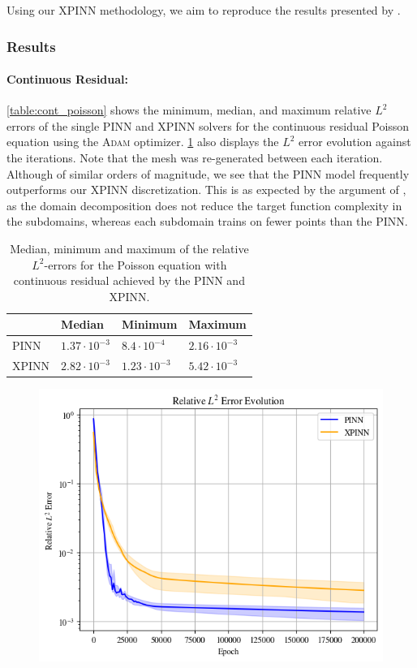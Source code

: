 Using our XPINN methodology, we aim to reproduce the results presented by \textcite{XPINN_generalize}.

\subsubsection{Results}
\paragraph{Continuous Residual:}
\autoref{table:cont_poisson} shows the minimum, median, and maximum relative $L^2$ errors of the single PINN and XPINN solvers for the continuous residual Poisson equation using the \textsc{Adam} optimizer. \ref{fig:rel_l2_smooth_poisson} also displays the $L^2$ error evolution against the iterations. Note that the mesh was re-generated between each iteration. Although of similar orders of magnitude, we see that the PINN model frequently outperforms our XPINN discretization. This is as expected by the argument of \textcite{XPINN_generalize}, as the domain decomposition does not reduce the target function
complexity in the subdomains, whereas each subdomain trains on fewer points than the PINN. 

\begin{table}[h]
\caption{Median, minimum and maximum of the relative $L^2$-errors for the Poisson equation with continuous residual achieved by the PINN and XPINN.}
    \centering
    \begin{tabularx}{\linewidth}{|X|XXX|}
    \hline
     & Median & Minimum & Maximum
    \\
    \hline
    PINN &$1.37\cdot 10^{-3}$ &  $8.4 \cdot 10^{-4}$&$2.16 \cdot 10^{-3}$ 
    \\
    XPINN &$2.82\cdot 10^{-3}$ &  $1.23 \cdot 10^{-3}$&$5.42 \cdot 10^{-3}$
    \\
    \hline
    \end{tabularx}
    \label{table:cont_poisson}
\end{table}
\begin{figure}[h!]
    \centering
    \includegraphics[width = \linewidth]{Project1XPINNs/figures/Poisson/Relative_L2_smooth_Adam.png}
    \caption{}
    \label{fig:rel_l2_smooth_poisson}
\end{figure}

